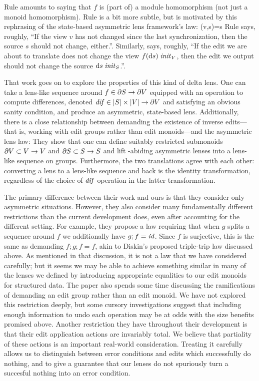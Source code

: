 Rule  amounts to saying that $f$ is (part of) a module homomorphism
(not just a monoid homomorphism). Rule  is a bit more subtle, but is
motivated by this rephrasing of the state-based asymmetric lens framework's
 law:
    {\aput(v,s)=s}
Rule  says, roughly, ``If the view $v$ has not changed since
the last synchronization, then the source $s$ should not change, either.''.
Similarly,  says, roughly, ``If the edit we are about to translate
does not change the view $f(\textrm{d} s)\;\mathit{init}_V$, then the edit we output should
not change the source $\textrm{d} s\;\mathit{init}_S$.''.

That work goes on to explore the properties of this kind of delta lens. One
can take a lens-like sequence around $f\in\partial S\to\partial V$ equipped with an
operation to compute differences, denoted $\mathit{dif}\in|S|\times|V|\to\partial V$ and
satisfying an obvious sanity condition, and produce an asymmetric,
state-based lens. Additionally, there is a close relationship between
demanding the existence of inverse edits---that is, working with edit groups
rather than edit monoids---and the  asymmetric lens law:
They show that one can define suitably restricted submonoids $\partial V \subset V
\to V$ and $\partial S \subset S \to S$ and lift -abiding asymmetric
lenses into a lens-like sequence on groups. Furthermore, the two
translations agree with each other: converting a lens to a lens-like
sequence and back is the identity transformation, regardless of the choice
of $\mathit{dif}$ operation in the latter transformation.

The primary difference between their work and ours is that they consider
only asymmetric situations. However, they also consider many fundamentally
different restrictions than the current development does, even after
accounting for the different setting. For example, they propose a law
requiring that when $g$ splits a sequence around $f$ we additionally have
$g;f=\mathit{id}$. Since $f$ is surjective, this is the same as demanding $f;g;f=f$,
akin to Diskin's proposed triple-trip law discussed above. As mentioned in
that discussion, it is not a law that we have considered carefully; but it
seems we may be able to achieve something similar in many of the lenses we
defined by introducing appropriate equalities to our edit monoids for
structured data. The paper also spends some time discussing the
ramifications of demanding an edit group rather than an edit monoid. We have
not explored this restriction deeply, but some cursory investigations
suggest that including enough information to undo each operation may be at
odds with the size benefits promised above. Another restriction they have
throughout their development is that their edit application actions are
invariably total. We believe that partiality of these actions is an
important real-world consideration. Treating it carefully allows us to
distinguish between error conditions and edits which successfully do
nothing, and to give a guarantee that our lenses do not spuriously turn a
succesful nothing into an error condition.

